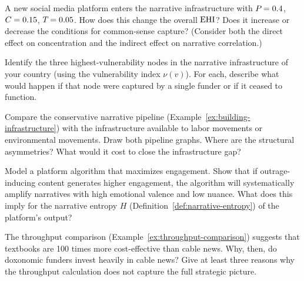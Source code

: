 \begin{exercise}
A new social media platform enters the narrative infrastructure with $P_{} = 0.4$, $C_{} = 0.15$, $T_{} = 0.05$.
How does this change the overall $\mathrm{EHI}$?
Does it increase or decrease the conditions for common-sense capture?
(Consider both the direct effect on concentration and the indirect effect on narrative correlation.)
\end{exercise}

\begin{exercise}
\label{ex:ch7-bottleneck}
Identify the three highest-vulnerability nodes in the narrative infrastructure of your country (using the vulnerability index $\nu(v)$).
For each, describe what would happen if that node were captured by a single funder or if it ceased to function.
\end{exercise}

\begin{exercise}
Compare the conservative narrative pipeline (Example~\ref{ex:building-infrastructure}) with the infrastructure available to labor movements or environmental movements.
Draw both pipeline graphs.
Where are the structural asymmetries?
What would it cost to close the infrastructure gap?
\end{exercise}

\begin{exercise}
\label{ex:ch7-algorithm}
Model a platform algorithm that maximizes engagement.
Show that if outrage-inducing content generates higher engagement, the algorithm will systematically amplify narratives with high emotional valence and low nuance.
What does this imply for the narrative entropy $H$ (Definition~\ref{def:narrative-entropy}) of the platform's output?
\end{exercise}

\begin{exercise}
The throughput comparison (Example~\ref{ex:throughput-comparison}) suggests that textbooks are 100 times more cost-effective than cable news.
Why, then, do doxonomic funders invest heavily in cable news?
Give at least three reasons why the throughput calculation does not capture the full strategic picture.
\end{exercise}
